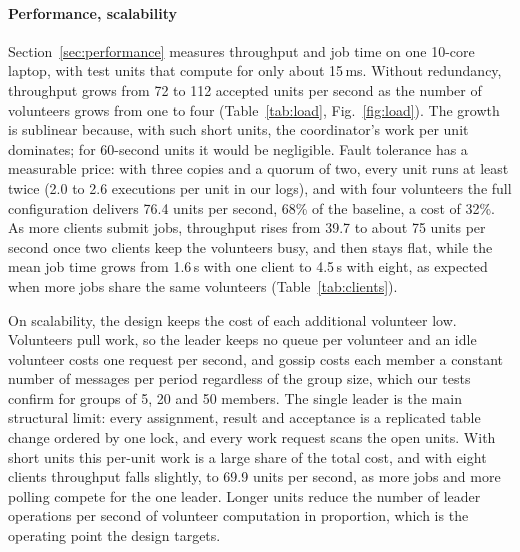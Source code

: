 \paragraph{Performance, scalability} Section~\ref{sec:performance} measures throughput and job time on one 10-core laptop, with test units that compute for only about 15\,ms. Without redundancy, throughput grows from 72 to 112 accepted units per second as the number of volunteers grows from one to four (Table~\ref{tab:load}, Fig.~\ref{fig:load}). The growth is sublinear because, with such short units, the coordinator's work per unit dominates; for 60-second units it would be negligible. Fault tolerance has a measurable price: with three copies and a quorum of two, every unit runs at least twice (2.0 to 2.6 executions per unit in our logs), and with four volunteers the full configuration delivers 76.4 units per second, 68\% of the baseline, a cost of 32\%. As more clients submit jobs, throughput rises from 39.7 to about 75 units per second once two clients keep the volunteers busy, and then stays flat, while the mean job time grows from 1.6\,s with one client to 4.5\,s with eight, as expected when more jobs share the same volunteers (Table~\ref{tab:clients}).

On scalability, the design keeps the cost of each additional volunteer low. Volunteers pull work, so the leader keeps no queue per volunteer and an idle volunteer costs one request per second, and gossip costs each member a constant number of messages per period regardless of the group size, which our tests confirm for groups of 5, 20 and 50 members. The single leader is the main structural limit: every assignment, result and acceptance is a replicated table change ordered by one lock, and every work request scans the open units. With short units this per-unit work is a large share of the total cost, and with eight clients throughput falls slightly, to 69.9 units per second, as more jobs and more polling compete for the one leader. Longer units reduce the number of leader operations per second of volunteer computation in proportion, which is the operating point the design targets.

